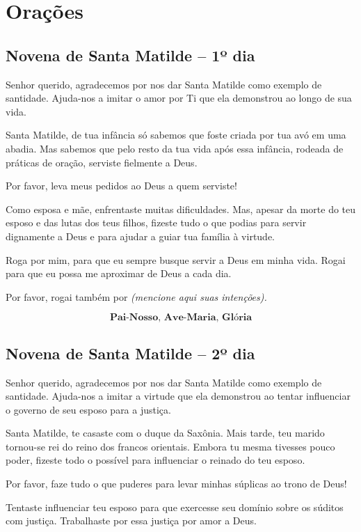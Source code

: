 \documentclass[a4paper,14pt]{extarticle} \usepackage[utf8]{inputenc}
\begin{document}
\section{Orações}

\subsection{Novena de Santa Matilde – 1º dia}

Senhor querido, agradecemos por nos dar Santa Matilde como exemplo de santidade. Ajuda-nos a imitar o amor por Ti que ela demonstrou ao longo de sua vida.

Santa Matilde, de tua infância só sabemos que foste criada por tua avó em uma abadia. Mas sabemos que pelo resto da tua vida após essa infância, rodeada de práticas de oração, serviste fielmente a Deus.

Por favor, leva meus pedidos ao Deus a quem serviste!

Como esposa e mãe, enfrentaste muitas dificuldades. Mas, apesar da morte do teu esposo e das lutas dos teus filhos, fizeste tudo o que podias para servir dignamente a Deus e para ajudar a guiar tua família à virtude.

Roga por mim, para que eu sempre busque servir a Deus em minha vida. Rogai para que eu possa me aproximar de Deus a cada dia.

Por favor, rogai também por \textit{(mencione aqui suas intenções).}

\[\textbf{Pai-Nosso, Ave-Maria, Glória}\]


\subsection{Novena de Santa Matilde – 2º dia}



Senhor querido, agradecemos por nos dar Santa Matilde como exemplo de santidade. Ajuda-nos a imitar a virtude que ela demonstrou ao tentar influenciar o governo de seu esposo para a justiça.

Santa Matilde, te casaste com o duque da Saxônia. Mais tarde, teu marido tornou-se rei do reino dos francos orientais. Embora tu mesma tivesses pouco poder, fizeste todo o possível para influenciar o reinado do teu esposo.

Por favor, faze tudo o que puderes para levar minhas súplicas ao trono de Deus!

Tentaste influenciar teu esposo para que exercesse seu domínio sobre os súditos com justiça. Trabalhaste por essa justiça por amor a Deus.
\end{document}
